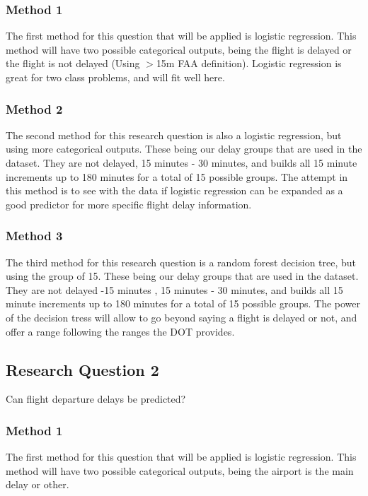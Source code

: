 \documentclass[a4paper,12pt]{article}
\begin{document}
\subsubsection{Method 1}

The first method for this question that will be applied is logistic regression. This method will have two possible categorical outputs, being the flight is delayed
or the flight is not delayed (Using $>$15m FAA definition). Logistic regression is great for two class problems, and will fit well here.

\subsubsection{Method 2}
The second method for this research question is also a logistic regression, but using more categorical outputs. These being our delay groups that are used in the dataset. They are not delayed, 15 minutes - 30 minutes, and builds all 15 minute increments
up to 180 minutes for a total of 15 possible groups. The attempt in this method is to see with the data if logistic regression can be expanded as a good predictor for more specific
flight delay information.

\subsubsection{Method 3}
The third method for this research question is a random forest decision tree, but using the group of 15. These being our delay groups that are used in the dataset. They are not delayed -15 minutes , 15 minutes - 30 minutes, and builds all 15 minute increments
up to 180 minutes for a total of 15 possible groups. The power of the decision tress will allow to go beyond saying a flight is delayed or not, and offer a range following the ranges the DOT provides.

\subsection{Research Question 2}
Can flight departure delays be predicted?

\subsubsection{Method 1}
The first method for this question that will be applied is logistic regression. This method will have two possible categorical outputs, being the airport is the main delay
or other.
\end{document}
